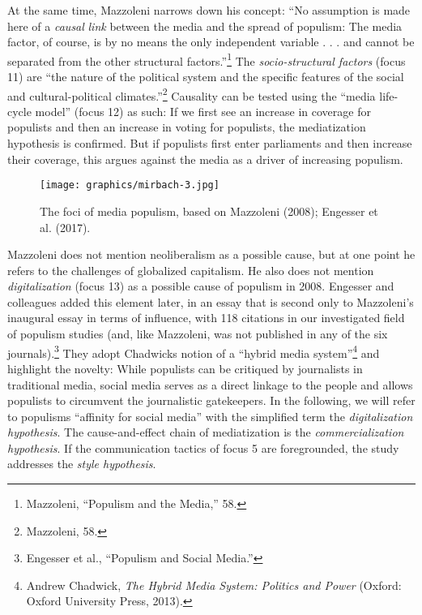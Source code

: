 \documentclass{tufte-handout}
\begin{document}
At the same time, Mazzoleni narrows down his concept: ``No assumption is
made here of a \emph{causal} \emph{link} between the media and the
spread of populism: The media factor, of course, is by no means the only
\textquotesingle independent variable\textquotesingle{} . . . and cannot
be separated from the other structural factors.''\footnote{Mazzoleni,
  ``Populism and the Media,'' 58.} The \emph{socio-structural factors}
(focus 11) are ``the nature of the political system and the specific
features of the social and cultural-political climates.''\footnote{Mazzoleni,
  58.} Causality can be tested using the ``media life-cycle model''
(focus 12) as such: If we first see an increase in coverage for
populists and then an increase in voting for populists, the
mediatization hypothesis is confirmed. But if populists first enter
parliaments and then increase their coverage, this argues against the
media as a driver of increasing populism.

\setcounter{figure}{3}  

\begin{figure}
    \centering
    \texttt{[image: graphics/mirbach-3.jpg]}
    \caption{The foci of media populism, based on Mazzoleni (2008);
Engesser et al. (2017).}
    \label{fig:four}
\end{figure}


Mazzoleni does not mention neoliberalism as a possible cause, but at one
point he refers to the challenges of globalized capitalism. He also does
not mention \emph{digitalization} (focus 13) as a possible cause of
populism in 2008. Engesser and colleagues added this element later, in
an essay that is second only to Mazzoleni's inaugural essay in terms of
influence, with 118 citations in our investigated field of populism
studies (and, like Mazzoleni, was not published in any of the six
journals).\footnote{Engesser et al., ``Populism and Social Media.''}
They adopt Chadwick\textquotesingle s notion of a ``hybrid media
system''\footnote{Andrew Chadwick, \emph{The Hybrid Media System:
  Politics and Power} (Oxford: Oxford University Press, 2013).} and
highlight the novelty: While populists can be critiqued by journalists
in traditional media, social media serves as a direct linkage to the
people and allows populists to circumvent the journalistic gatekeepers.
In the following, we will refer to populism\textquotesingle s ``affinity
for social media'' with the simplified term the \emph{digitalization
hypothesis}. The cause-and-effect chain of mediatization is the
\emph{commercialization hypothesis}. If the communication tactics of
focus 5 are foregrounded, the study addresses the \emph{style
hypothesis}.
\end{document}
